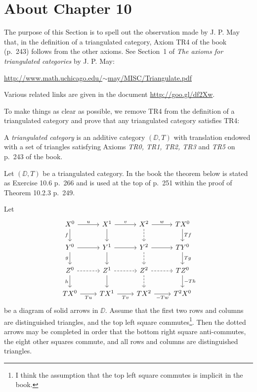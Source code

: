 \documentclass[12pt]{article}
\theoremstyle{remark}
\theoremstyle{definition}
\begin{document}

\section{About Chapter 10}


The purpose of this Section is to spell out the observation made by J. P. May that, in the definition of a triangulated category, Axiom TR4 of the book (p.~243) follows from the other axioms. See Section~1 of {\em The axioms for triangulated categories} by J. P. May: 
\begin{center}\href{http://www.math.uchicago.edu/~may/MISC/Triangulate.pdf}{http://www.math.uchicago.edu/$\sim$may/MISC/Triangulate.pdf} 
\end{center} 
Various related links are given in the document \href{http://goo.gl/df2Xw}{http://goo.gl/df2Xw}. 

To make things as clear as possible, we remove TR4 from the definition of a triangulated category and prove that any triangulated category satisfies TR4:

\begin{df} 
A {\em triangulated category} is an additive category $(\DD,T)$ with translation endowed with a set of triangles satisfying Axioms {\em TR0, TR1, TR2, TR3} and {\em TR5} on p.~243 of the book.
\end{df}

Let $(\DD,T)$ be a triangulated category. In the book the theorem below is stated as Exercise 10.6 p.~266 and is used at the top of p.~251 within the proof of Theorem 10.2.3 p.~249.

\begin{thm}
Let 
$$
\begin{tikzcd}
X^0\ar{r}{u}\ar{d}[swap]{f}&X^1\ar{d}\ar{r}{v}&X^2\ar[dashed]{d}\ar{r}{w}&TX^0\ar{d}{Tf}\\ 
Y^0\ar{r}\ar{d}[swap]{g}&Y^1\ar{d}\ar{r}&Y^2\ar[dashed]{d}\ar{r}&TY^0\ar{d}{Tg}\\ 
Z^0\ar[dashed]{r}\ar{d}[swap]{h}&Z^1\ar{d}\ar[dashed]{r}&Z^2\ar[dashed]{d}\ar[dashed]{r}&TZ^0\ar{d}{-Th}\\ 
TX^0\ar{r}[swap]{Tu}&TX^1\ar{r}[swap]{Tv}&TX^2\ar{r}[swap]{-Tw}&T^2X^0 
\end{tikzcd}
$$ 
be a diagram of solid arrows in $\DD$. Assume that the first two rows and columns are distinguished triangles, and the top left square commutes\footnote{I think the assumption that the top left square commutes is implicit in the book.}. Then the dotted arrows may be completed in order that the bottom right square anti-commutes, the eight other squares commute, and all rows and columns are distinguished triangles. 
\end{thm}
\end{document}
